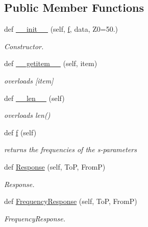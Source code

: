 \subsection*{Public Member Functions}
\begin{DoxyCompactItemize}
\item 
def \hyperlink{classSignalIntegrity_1_1SParameters_1_1SParameters_1_1SParameters_a2590c40d1c3d840ed297c8f1ddcc74a4}{\+\_\+\+\_\+init\+\_\+\+\_\+} (self, \hyperlink{classSignalIntegrity_1_1SParameters_1_1SParameters_1_1SParameters_a32e7a34d6837fe949b413c852a0447f8}{f}, data, Z0=50.)
\begin{DoxyCompactList}\small\item\em Constructor. \end{DoxyCompactList}\item 
def \hyperlink{classSignalIntegrity_1_1SParameters_1_1SParameters_1_1SParameters_aab91ae2e037c39b631a69273c277bfe9}{\+\_\+\+\_\+getitem\+\_\+\+\_\+} (self, item)
\begin{DoxyCompactList}\small\item\em overloads \mbox{[}item\mbox{]} \end{DoxyCompactList}\item 
def \hyperlink{classSignalIntegrity_1_1SParameters_1_1SParameters_1_1SParameters_a810fdc262754b6d21f5acd0e280d4daf}{\+\_\+\+\_\+len\+\_\+\+\_\+} (self)
\begin{DoxyCompactList}\small\item\em overloads len() \end{DoxyCompactList}\item 
def \hyperlink{classSignalIntegrity_1_1SParameters_1_1SParameters_1_1SParameters_a32e7a34d6837fe949b413c852a0447f8}{f} (self)
\begin{DoxyCompactList}\small\item\em returns the frequencies of the s-\/parameters \end{DoxyCompactList}\item 
def \hyperlink{classSignalIntegrity_1_1SParameters_1_1SParameters_1_1SParameters_ab43ea05f175742449365ff9a3abab7d7}{Response} (self, ToP, FromP)
\begin{DoxyCompactList}\small\item\em Response. \end{DoxyCompactList}\item 
def \hyperlink{classSignalIntegrity_1_1SParameters_1_1SParameters_1_1SParameters_a55a7157cd888766a891ff22694e62613}{Frequency\+Response} (self, ToP, FromP)
\begin{DoxyCompactList}\small\item\em Frequency\+Response. \end{DoxyCompactList}\item 

\end{DoxyCompactItemize}
